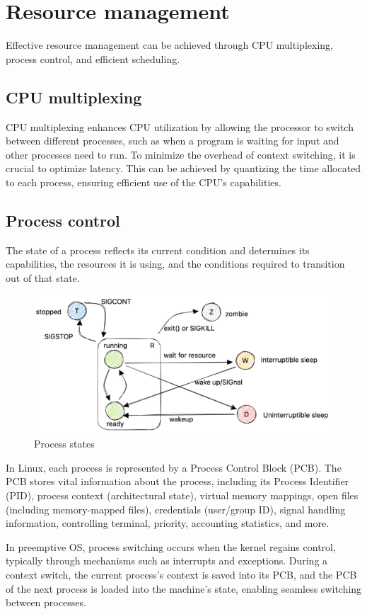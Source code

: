 \section{Resource management}

Effective resource management can be achieved through CPU multiplexing, process control, and efficient scheduling.

\subsection{CPU multiplexing}
CPU multiplexing enhances CPU utilization by allowing the processor to switch between different processes, such as when a program is waiting for input and other processes need to run. 
To minimize the overhead of context switching, it is crucial to optimize latency. 
This can be achieved by quantizing the time allocated to each process, ensuring efficient use of the CPU's capabilities.

\subsection{Process control}
The state of a process reflects its current condition and determines its capabilities, the resources it is using, and the conditions required to transition out of that state.
\begin{figure}[H]
    \centering
    \includegraphics[width=0.75\linewidth]{images/proc.png}
    \caption{Process states}
\end{figure}
In Linux, each process is represented by a Process Control Block (PCB).
The PCB stores vital information about the process, including its Process Identifier (PID), process context (architectural state), virtual memory mappings, open files (including memory-mapped files), credentials (user/group ID), signal handling information, controlling terminal, priority, accounting statistics, and more.

In preemptive OS, process switching occurs when the kernel regains control, typically through mechanisms such as interrupts and exceptions. 
During a context switch, the current process's context is saved into its PCB, and the PCB of the next process is loaded into the machine's state, enabling seamless switching between processes.

